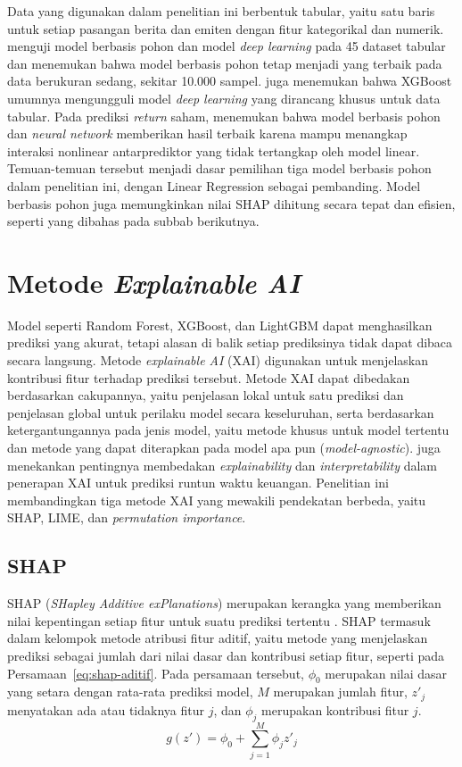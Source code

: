 Data yang digunakan dalam penelitian ini berbentuk tabular, yaitu satu baris untuk setiap pasangan berita dan emiten dengan fitur kategorikal dan numerik. \textcite{grinsztajn2022} menguji model berbasis pohon dan model \emph{deep learning} pada 45 dataset tabular dan menemukan bahwa model berbasis pohon tetap menjadi yang terbaik pada data berukuran sedang, sekitar 10.000 sampel. \textcite{shwartzziv2022} juga menemukan bahwa XGBoost umumnya mengungguli model \emph{deep learning} yang dirancang khusus untuk data tabular. Pada prediksi \emph{return} saham, \textcite{gu2020} menemukan bahwa model berbasis pohon dan \emph{neural network} memberikan hasil terbaik karena mampu menangkap interaksi nonlinear antarprediktor yang tidak tertangkap oleh model linear. Temuan-temuan tersebut menjadi dasar pemilihan tiga model berbasis pohon dalam penelitian ini, dengan Linear Regression sebagai pembanding. Model berbasis pohon juga memungkinkan nilai SHAP dihitung secara tepat dan efisien, seperti yang dibahas pada subbab berikutnya.

\section{Metode \emph{Explainable AI}}
\label{sec:xai}

Model seperti Random Forest, XGBoost, dan LightGBM dapat menghasilkan prediksi yang akurat, tetapi alasan di balik setiap prediksinya tidak dapat dibaca secara langsung. Metode \emph{explainable AI} (XAI) digunakan untuk menjelaskan kontribusi fitur terhadap prediksi tersebut. Metode XAI dapat dibedakan berdasarkan cakupannya, yaitu penjelasan lokal untuk satu prediksi dan penjelasan global untuk perilaku model secara keseluruhan, serta berdasarkan ketergantungannya pada jenis model, yaitu metode khusus untuk model tertentu dan metode yang dapat diterapkan pada model apa pun (\emph{model-agnostic}). \textcite{arsenault2025} juga menekankan pentingnya membedakan \emph{explainability} dan \emph{interpretability} dalam penerapan XAI untuk prediksi runtun waktu keuangan. Penelitian ini membandingkan tiga metode XAI yang mewakili pendekatan berbeda, yaitu SHAP, LIME, dan \emph{permutation importance}.

\subsection{SHAP}

SHAP (\emph{SHapley Additive exPlanations}) merupakan kerangka yang memberikan nilai kepentingan setiap fitur untuk suatu prediksi tertentu \autocite{lundberg2017}. SHAP termasuk dalam kelompok metode atribusi fitur aditif, yaitu metode yang menjelaskan prediksi sebagai jumlah dari nilai dasar dan kontribusi setiap fitur, seperti pada Persamaan~\ref{eq:shap-aditif}. Pada persamaan tersebut, $\phi_0$ merupakan nilai dasar yang setara dengan rata-rata prediksi model, $M$ merupakan jumlah fitur, $z'_j$ menyatakan ada atau tidaknya fitur $j$, dan $\phi_j$ merupakan kontribusi fitur $j$.
\begin{equation}
g(z') = \phi_0 + \sum_{j=1}^{M} \phi_j z'_j
\label{eq:shap-aditif}
\end{equation}

